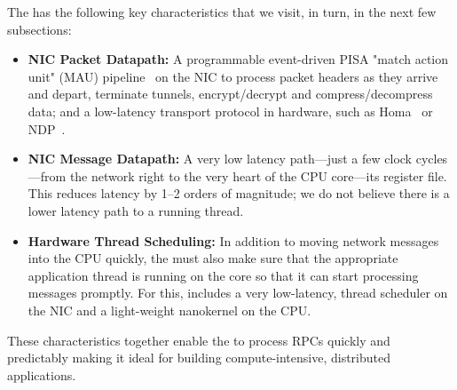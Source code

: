 The \name{} has the following key characteristics that we visit, in turn, in the next few subsections: 
\begin{itemize}[topsep=0.4\baselineskip, leftmargin=20pt]
    \item {\bf NIC Packet Datapath:} A programmable event-driven PISA "match action unit" (MAU) pipeline~\cite{event-driven-pisa} on the NIC to process packet headers as they arrive and depart, terminate tunnels, encrypt/decrypt and compress/decompress data; and a low-latency transport protocol in hardware, such as Homa~\cite{homa} or NDP~\cite{ndp}.
    
    \item {\bf NIC Message Datapath:} A very low latency path---just a few clock cycles---from the network right to the very heart of the CPU core---its register file. 
    This reduces latency by 1--2 orders of magnitude; we do not believe there is a lower latency path to a running thread.
    
    \item {\bf Hardware Thread Scheduling:} In addition to moving network messages into the CPU quickly, the \name{} must also make sure that the appropriate application thread is running on the core so that it can start processing messages promptly. For this, \name{} includes a very low-latency, thread scheduler on the NIC and a light-weight nanokernel on the CPU.
\end{itemize}

These characteristics together enable the \name{} to process RPCs quickly and predictably making it ideal for building compute-intensive, distributed applications.





